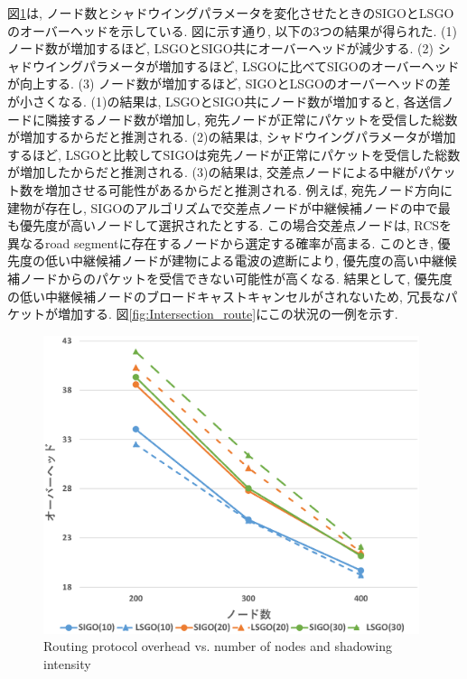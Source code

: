 \documentclass[10pt]{jreport}
\begin{document}
図\ref{fig:SIGO_overhead}は, ノード数とシャドウイングパラメータを変化させたときのSIGOとLSGOのオーバーヘッドを示している.
図に示す通り, 以下の3つの結果が得られた.
(1) ノード数が増加するほど, LSGOとSIGO共にオーバーヘッドが減少する.
(2) シャドウイングパラメータが増加するほど, LSGOに比べてSIGOのオーバーヘッドが向上する.
(3) ノード数が増加するほど, SIGOとLSGOのオーバーヘッドの差が小さくなる.
(1)の結果は, LSGOとSIGO共にノード数が増加すると, 各送信ノードに隣接するノード数が増加し, 宛先ノードが正常にパケットを受信した総数が増加するからだと推測される.
(2)の結果は, シャドウイングパラメータが増加するほど, LSGOと比較してSIGOは宛先ノードが正常にパケットを受信した総数が増加したからだと推測される. 
(3)の結果は, 交差点ノードによる中継がパケット数を増加させる可能性があるからだと推測される.
例えば, 宛先ノード方向に建物が存在し, SIGOのアルゴリズムで交差点ノードが中継候補ノードの中で最も優先度が高いノードして選択されたとする. この場合交差点ノードは, RCSを異なるroad segmentに存在するノードから選定する確率が高まる. このとき, 優先度の低い中継候補ノードが建物による電波の遮断により, 優先度の高い中継候補ノードからのパケットを受信できない可能性が高くなる. 結果として, 優先度の低い中継候補ノードのブロードキャストキャンセルがされないため, 冗長なパケットが増加する.
図\ref{fig:Intersection_route}にこの状況の一例を示す.


\begin{figure}[!ht]
	\centering
	\includegraphics[width=110mm]{figures/SIGO_overhead.eps}
	\caption{Routing protocol overhead vs. number of nodes and shadowing intensity}
	\label{fig:SIGO_overhead}
\end{figure}
\end{document}
